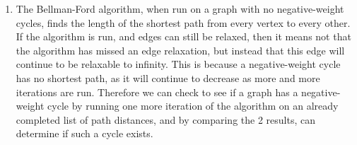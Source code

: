 \documentclass{article}
\begin{document}
\begin{enumerate}
		\item The Bellman-Ford algorithm, when run on a graph with no negative-weight cycles, finds the length of the shortest path from every vertex to every other. If the algorithm is run, and edges can still be relaxed, then it means not that the algorithm has missed an edge relaxation, but instead that this edge will continue to be relaxable to infinity. This is because a negative-weight cycle has no shortest path, as it will continue to decrease as more and more iterations are run. Therefore we can check to see if a graph has a negative-weight cycle by running one more iteration of the algorithm on an already completed list of path distances, and by comparing the 2 results, can determine if such a cycle exists.
	\end{enumerate}
\end{document}
